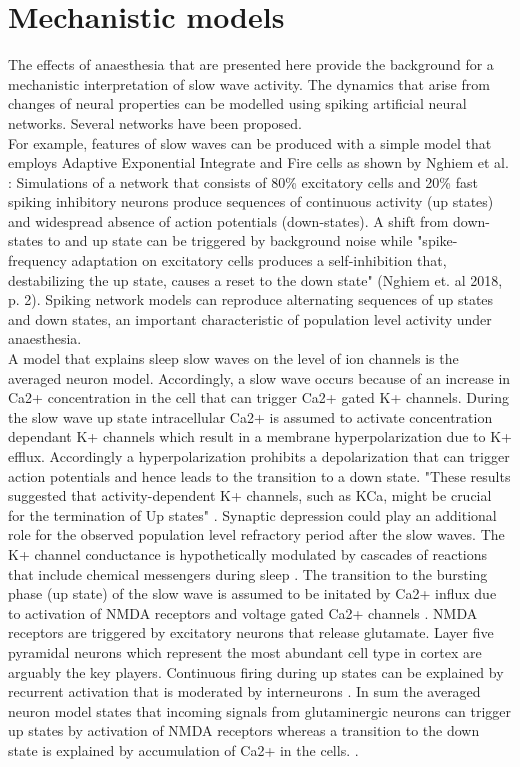 \section{Mechanistic models}
\label{mechanistic_models}
The effects of anaesthesia that are presented here provide the background for a mechanistic interpretation of slow wave activity. The dynamics that arise from changes of neural properties can be modelled using spiking artificial neural networks. Several networks have been proposed.\\
For example, features of slow waves can be produced with a simple model that employs Adaptive Exponential Integrate and Fire cells as shown by Nghiem et al. \parencite{nghiem2018two}: Simulations of a network that consists of 80\% excitatory cells and 20\% fast spiking inhibitory neurons produce sequences of continuous activity (up states) and widespread absence of action potentials (down-states). A shift from down-states to and up state can be triggered by background noise while "spike-frequency adaptation on excitatory cells produces a self-inhibition that, destabilizing the up state, causes a reset to the down state" (Nghiem et. al 2018, p. 2). Spiking network models can reproduce alternating sequences of up states and down states, an important characteristic of population level activity under anaesthesia. \\
A model that explains sleep slow waves on the level of ion channels is the averaged neuron model. Accordingly, a slow wave occurs because of an increase in Ca2+ concentration in the cell that can trigger Ca2+ gated K+ channels. During the slow wave up state intracellular Ca2+ is assumed to activate concentration dependant K+ channels which result in a membrane hyperpolarization due to K+ efflux. Accordingly a hyperpolarization prohibits a depolarization that can trigger action potentials and hence leads to the transition to a down state. "These results suggested that activity-dependent K+ channels, such as KCa, might be crucial for the termination of Up states" \parencite{neske2016slow}. Synaptic depression could play an additional role for the observed population level refractory period after the slow waves. The K+ channel conductance is hypothetically modulated by cascades of reactions that include chemical messengers during sleep \parencite{shi2019genes}. The transition to the bursting phase (up state) of the slow wave is assumed to be initated by Ca2+ influx due to activation of NMDA receptors and voltage gated Ca2+ channels \parencite{shi2018ca2+}. NMDA receptors are triggered by excitatory neurons that release glutamate. Layer five pyramidal neurons which represent the most abundant cell type in cortex are arguably the key players. Continuous firing during up states can be explained by recurrent activation that is moderated by interneurons \parencite{neske2016slow}. In sum the averaged neuron model states that incoming signals from glutaminergic neurons can trigger up states by activation of NMDA receptors whereas a transition to the down state is explained by accumulation of Ca2+ in the cells. \parencite{shi2019genes}.\\

